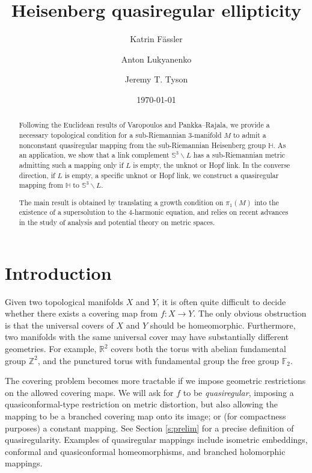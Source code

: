 \documentclass[10pt,letterpaper]{amsart}
\title{Heisenberg quasiregular ellipticity}
\author[K. F\"assler]{Katrin F\"assler}
\author[A. Lukyanenko]{Anton Lukyanenko}
\author[J. T. Tyson]{Jeremy T. Tyson}
\date{\today}
\theoremstyle{definition}
\numberwithin{thm}{subsection}
\numberwithin{equation}{section}
\begin{document}
\begin{abstract}
Following the Euclidean results of Varopoulos and Pankka--Rajala, we
provide a necessary topological condition for a sub-Riemannian
3-manifold $M$ to admit  a nonconstant quasiregular
mapping from
the sub-Riemannian Heisenberg group $\mathbb{H}$. As an application, we show that a link complement
${\mathbb S}^3\backslash L$ has a sub-Riemannian metric admitting such a mapping  only if $L$ is empty, the unknot or Hopf link. In the converse direction, if $L$ is empty, a specific unknot or Hopf link, we construct a quasiregular mapping from $\mathbb{H}$ to ${\mathbb S}^3\backslash L$.

The main result is obtained by translating a growth condition on $\pi_1(M)$ into the existence of a supersolution to the $4$-harmonic equation, and relies on recent advances in the study of analysis and potential theory on metric spaces.
\end{abstract}

\maketitle

\section{Introduction}

\setcounter{subsection}{0}
\setcounter{thm}{0}

Given two topological manifolds $X$ and $Y$, it is often quite difficult to decide whether there exists a covering map from $f: X\rightarrow Y$.
The only obvious obstruction is that the universal covers of $X$ and $Y$ should be homeomorphic.
Furthermore, two manifolds with the same universal cover may have substantially different geometries.
For example, ${\mathbb R}^2$ covers both the torus with abelian fundamental group ${\mathbb Z}^2$, and the punctured torus with fundamental group the free group $\mathbb F_2$.

The covering problem becomes more tractable if we impose geometric
restrictions on the allowed covering maps.  We will ask for $f$ to
be \emph{quasiregular}, imposing a quasiconformal-type restriction
on metric distortion, but also allowing the mapping to be a
{branched} covering map {onto its image}; or (for compactness
purposes) a constant mapping. See Section \ref{s:prelim} for a precise
definition of quasiregularity. Examples of quasiregular mappings
include isometric embeddings, conformal and quasiconformal
home\nobreak{}omorphisms, and branched holomorphic mappings.
\end{document}
